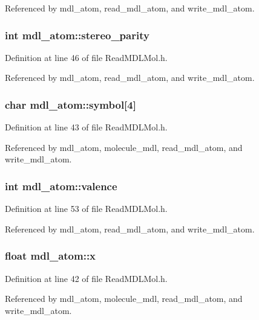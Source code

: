 Referenced by mdl\_\-atom, read\_\-mdl\_\-atom, and write\_\-mdl\_\-atom.
\subsubsection{\setlength{\rightskip}{0pt plus 5cm}int mdl\_\-atom::stereo\_\-parity}\label{structmdl__atom_m6}




Definition at line 46 of file Read\-MDLMol.h.

Referenced by mdl\_\-atom, read\_\-mdl\_\-atom, and write\_\-mdl\_\-atom.
\subsubsection{\setlength{\rightskip}{0pt plus 5cm}char mdl\_\-atom::symbol[4]}\label{structmdl__atom_m3}




Definition at line 43 of file Read\-MDLMol.h.

Referenced by mdl\_\-atom, molecule\_\-mdl, read\_\-mdl\_\-atom, and write\_\-mdl\_\-atom.
\subsubsection{\setlength{\rightskip}{0pt plus 5cm}int mdl\_\-atom::valence}\label{structmdl__atom_m9}




Definition at line 53 of file Read\-MDLMol.h.

Referenced by mdl\_\-atom, read\_\-mdl\_\-atom, and write\_\-mdl\_\-atom.
\subsubsection{\setlength{\rightskip}{0pt plus 5cm}float mdl\_\-atom::x}\label{structmdl__atom_m0}




Definition at line 42 of file Read\-MDLMol.h.

Referenced by mdl\_\-atom, molecule\_\-mdl, read\_\-mdl\_\-atom, and write\_\-mdl\_\-atom.
